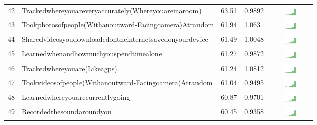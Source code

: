 \documentclass[a4paper,12pt]{article}
\begin{document}
\begin{longtable}{| p{0.5cm} | p{7cm} | p{1cm} |p{1cm} | c |}
42 & Trackedwhereyouareveryaccurately(Whereyouareinaroom) & 63.51&0.9892 & \includegraphics[width = 2cm, height = 0.5cm]{tables/trackedwhereyouareveryaccurately(whereyouareinaroom)combined} \\ 
43 & Tookphotosofpeople(Withanoutward-Facingcamera)Atrandom & 61.94&1.063 & \includegraphics[width = 2cm, height = 0.5cm]{tables/tookphotosofpeople(withanoutward-facingcamera)atrandomcombined} \\ 
44 & Sharedvideosyoudownloadedontheinternetsavedonyourdevice & 61.49&1.0048 & \includegraphics[width = 2cm, height = 0.5cm]{tables/sharedvideosyoudownloadedontheinternetsavedonyourdevicecombined} \\ 
45 & Learnedwhenandhowmuchyouspendtimealone & 61.27&0.9872 & \includegraphics[width = 2cm, height = 0.5cm]{tables/learnedwhenandhowmuchyouspendtimealonecombined} \\ 
46 & Trackedwhereyouare(Likeagps) & 61.24&1.0812 & \includegraphics[width = 2cm, height = 0.5cm]{tables/trackedwhereyouare(likeaGPS)combined} \\ 
47 & Tookvideosofpeople(Withanoutward-Facingcamera)Atrandom & 61.04&0.9495 & \includegraphics[width = 2cm, height = 0.5cm]{tables/tookvideosofpeople(withanoutward-facingcamera)atrandomcombined} \\ 
48 & Learnedwhereyouarecurrentlygoing & 60.87&0.9701 & \includegraphics[width = 2cm, height = 0.5cm]{tables/learnedwhereyouarecurrentlygoingcombined} \\ 
49 & Recordedthesoundaroundyou & 60.45&0.9358 & \includegraphics[width = 2cm, height = 0.5cm]{tables/recordedthesoundaroundyoucombined} \\ 

\end{longtable}
\end{document}
